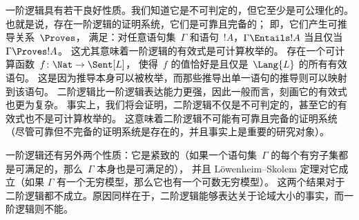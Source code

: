 \documentclass[../../../include/open-logic-section]{subfiles}
\begin{document}


一阶逻辑具有若干良好性质。我们知道它是不可判定的，但它至少是可公理化的。
也就是说，存在一阶逻辑的证明系统，它们是可靠且完备的；
即，它们产生可推导关系~$\Proves$，
满足：对任意语句集~$\Gamma$ 和语句~$!A$，$\Gamma \Entails !A$ 当且仅当 $\Gamma \Proves !A$。
这尤其意味着一阶逻辑的有效式是可计算枚举的。
存在一个可计算函数~$f\colon \Nat \to \Sent[L]$，
使得~$f$ 的值恰好是且仅是~$\Lang{L}$ 的所有有效语句。
这是因为推导本身可以被枚举，而那些推导出单一语句的推导则可以映射到该语句。
二阶逻辑比一阶逻辑表达能力更强，因此一般而言，刻画它的有效式也更为复杂。
事实上，我们将会证明，二阶逻辑不仅是不可判定的，甚至它的有效式也不是可计算枚举的。
这意味着二阶逻辑不可能有可靠且完备的证明系统（尽管可靠但不完备的证明系统是存在的，并且事实上是重要的研究对象）。

一阶逻辑还有另外两个性质：它是紧致的（如果一个语句集~$\Gamma$ 的每个有穷子集都是可满足的，那么~$\Gamma$ 本身也是可满足的），
并且 Löwenheim--Skolem 定理对它成立（如果 $\Gamma$ 有一个无穷模型，那么它也有一个可数无穷模型）。
这两个结果对于二阶逻辑都不成立。原因同样在于，二阶逻辑能够表达关于论域大小的事实，而一阶逻辑则不能。
\end{document}
